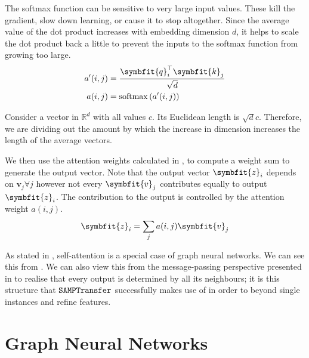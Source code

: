 The softmax function can be sensitive to very large input values. These kill the gradient, slow down learning, or cause it to stop altogether. Since the average value of the dot product increases with embedding dimension $d$, it helps to scale the dot product back a little to prevent the inputs to the softmax function from growing too large.
\begin{equation}
\label{eqn:qkv-attn-weight-calc}
\begin{split}
    a^\prime(i, j) &= \frac{\symbfit{q}_i^\top \symbfit{k}_j}{\sqrt{d}}\\
    a(i, j) &= \operatorname{softmax}\left( a^\prime(i, j) \right)\\
\end{split}
\end{equation}

\begin{tcolorbox}[title=Why $\sqrt{d}$?]
Consider a vector in $\mathbb{R}^d$ with all values $c$. Its Euclidean length is $\sqrt{d}c$. Therefore, we are dividing out the amount by which the increase in dimension increases the length of the average vectors.
\end{tcolorbox}

We then use the attention weights calculated in , to compute a weight sum to generate the output vector. Note that the output vector $\symbfit{z}_i$ depends on $\symbf{v}_j \forall j$ however not every $\symbfit{v}_j$ contributes equally to output $\symbfit{z}_i$. The contribution to the output is controlled by the attention weight $a(i, j)$.
\begin{equation}
    \label{eqn:qkv-attn-aggregation}
    \symbfit{z}_{i}=\sum_{j} a(i, j) \symbfit{v}_{j}
\end{equation}

As stated in , self-attention is a special case of graph neural networks. We can see this from . We can also view this from the message-passing perspective presented in  to realise that every output is determined by all its neighbours; it is this structure that $\texttt{SAMPTransfer}$ successfully makes use of in order to  beyond single instances and refine features.

\section{Graph Neural Networks}\label{sec:graph-nn}

